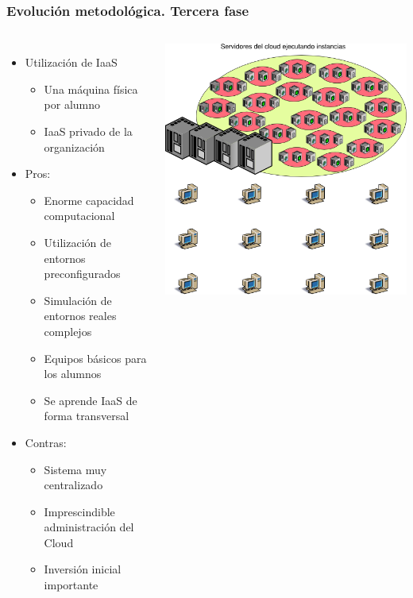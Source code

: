 \documentclass{beamer}
\begin{document}
\begin{frame}
  \frametitle{Evolución metodológica. Tercera fase}
  \begin{columns}
    \begin{itemize}
    \item Utilización de IaaS
      \begin{itemize}
      \item Una máquina física por alumno
      \item IaaS privado de la organización
      \end{itemize}
      \item Pros:
      \begin{itemize}
      \item Enorme capacidad computacional
      \item Utilización de entornos preconfigurados
      \item Simulación de entornos reales complejos
      \item Equipos básicos para los alumnos
      \item Se aprende IaaS de forma transversal
      \end{itemize}
      \item Contras:
      \begin{itemize}
      \item Sistema muy centralizado
      \item Imprescindible administración del Cloud
      \item Inversión inicial importante
      \end{itemize}
    \end{itemize}
    \includegraphics[width=\columnwidth]{../img/epoca3.png}
  \end{columns}
\end{frame}
\end{document}
